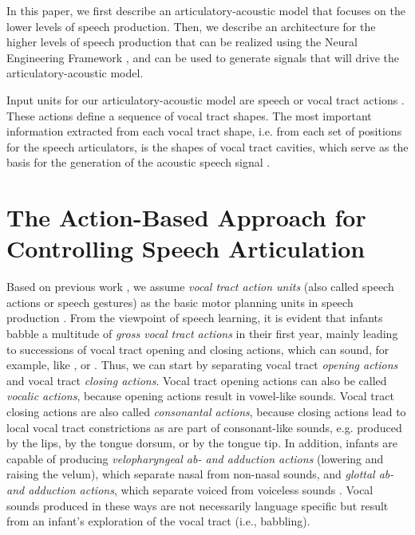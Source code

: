 \documentclass[conference]{IEEEtran}
\let\ipa\textipa
\begin{document}
In this paper, we first describe an articulatory-acoustic model
that focuses on the lower levels of speech production.
Then, we describe an architecture for the higher levels
of speech production that can be realized
using the Neural Engineering Framework \cite{eliasmith2003},
and can be used to generate signals that
will drive the articulatory-acoustic model.

Input units for our articulatory-acoustic model
are speech or vocal tract actions
\cite{kroger1993,kroger2010}. These actions define a sequence of vocal
tract shapes. The most important information extracted from each vocal
tract shape, i.e. from each set of positions
for the speech articulators, is the
shapes of vocal tract cavities, which serve as the basis for the
generation of the acoustic speech signal \cite{kroger1993}.

\section{The Action-Based Approach for Controlling Speech
  Articulation}

Based on previous work \cite{saltzman1989,goldstein2006}, we assume
\textit{vocal tract action units} (also called speech actions or
speech gestures) as the basic motor planning units in speech
production \cite{kroger2010}. From the viewpoint of speech learning, it
is evident that infants babble a multitude of
\textit{gross vocal tract actions} in their first year,
mainly leading to successions of
vocal tract opening and closing actions,
which can sound, for example,
like \ipa{[bAbA]}, \ipa{[dAdA]} or \ipa{[gAgA]}
\cite{kroger2009,kroger2014}. Thus, we
can start by separating vocal tract \textit{opening actions} and vocal
tract \textit{closing actions}. Vocal tract opening actions can also
be called \textit{vocalic actions}, because opening actions result in
vowel-like sounds. Vocal tract closing actions are also called
\textit{consonantal actions}, because closing actions
lead to local vocal tract constrictions
as are part of consonant-like sounds,
e.g. produced by the lips, by the tongue dorsum, or by
the tongue tip. In addition, infants are capable of producing
\textit{velopharyngeal ab- and adduction actions} (lowering and
raising the velum), which separate nasal from
non-nasal sounds, and \textit{glottal ab- and adduction actions},
which separate voiced from voiceless sounds \cite{kuhl2004}.
Vocal sounds produced in these ways are not
necessarily language specific but result from an infant's exploration of
the vocal tract (i.e., babbling).
\end{document}
